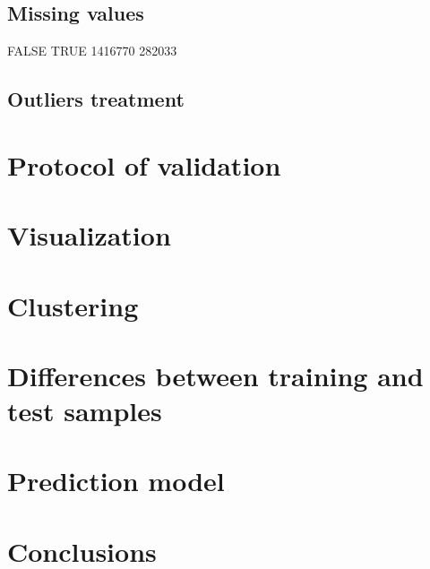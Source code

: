 \subsection{Missing values}

  FALSE    TRUE 
1416770  282033

\subsection{Outliers treatment}

\section{Protocol of validation}

\section{Visualization}

\section{Clustering}

\section{Differences between training and test samples}

\section{Prediction model}

\section{Conclusions}


